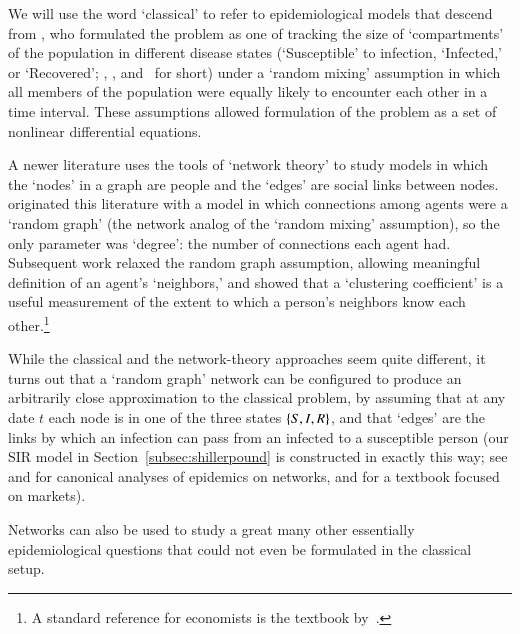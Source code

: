 We will use the word `classical' to refer to epidemiological models that descend from \cite{kermack_contribution_1927}, who formulated the problem as one of tracking the size of `compartments' of the population in different disease states (`Susceptible' to infection, `Infected,' or `Recovered'; \Susceptible, \Infected, and \Recovered~for short) under a `random mixing' assumption in which all members of the population were equally likely to encounter each other in a time interval.  These assumptions allowed formulation of the problem as a set of nonlinear differential equations.

A newer literature uses the tools of `network theory' to study models in which the `nodes' in a graph are people and the `edges' are social links between nodes.  \cite{erdos1960evolution} originated this literature with a model in which connections among agents were a `random graph' (the network analog of the `random mixing' assumption), so the only parameter was `degree': the number of connections each agent had.  Subsequent work relaxed the random graph assumption, allowing meaningful definition of an agent's `neighbors,' and showed that a `clustering coefficient' is a useful measurement of the extent to which a person's neighbors know each other.\footnote{A standard reference for economists is the textbook by~\cite{jackson_social_2010}.}


While the classical and the network-theory approaches seem quite different, it turns out that a `random graph' network can be configured to produce an arbitrarily close approximation to the classical problem, by assuming that at any date $t$ each node is in one of the three states $\{\Susceptible, \Infected, \Recovered\}$, and that `edges' are the links by which an infection can pass from an infected to a susceptible person (our SIR model in Section~\ref{subsec:shillerpound} is constructed in exactly this way; see \cite{newman2002spread} and \cite{jackson_social_2010} for canonical analyses of epidemics on networks, and \cite{easley_kleinberg_2010} for a textbook focused on markets).

Networks can also be used to study a great many other essentially epidemiological questions that could not even be formulated in the classical setup. %

